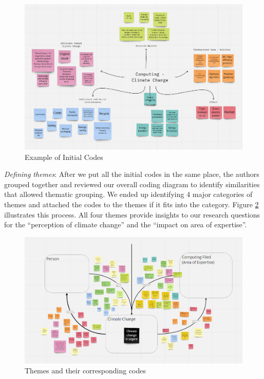 \begin{figure}
    \centering
    \includegraphics[scale = 0.2]{Figures/Initial Codes.png}
    \caption{Example of Initial Codes}
    \label{fig:initial-codes}
\end{figure}

\emph{Defining themes}: After we put all the initial codes in the same place, the authors grouped together and reviewed our overall coding diagram to identify similarities that allowed thematic grouping. We ended up identifying 4 major categories of themes and attached the codes to the themes if it fits into the category. Figure \ref{fig:theme-codes} illustrates this process. All four themes provide insights to our research questions for the “perception of climate change” and  the “impact on area of expertise”.

\begin{figure}
    \centering
    \includegraphics[scale = 0.2]{Figures/codes.png}
    \caption{Themes and their corresponding codes}
    \label{fig:theme-codes}
\end{figure}


